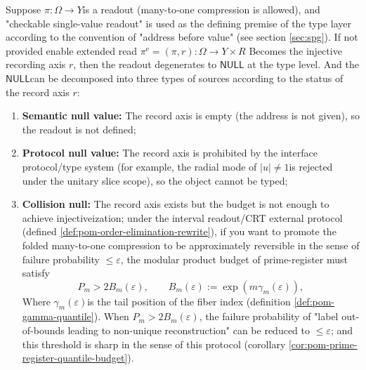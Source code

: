 \begin{proposition}\label{prop:xi-null-three-way}
Suppose \(\pi:\Omega\to Y\) ​​is a readout (many-to-one compression is allowed), and "checkable single-value readout" is used as the defining premise of the type layer according to the convention of "address before value" (see section \ref{sec:spg}).
If not provided enable extended read
\(
\pi^{\mathrm e}=(\pi,r):\Omega\to Y\times R
\)
Becomes the injective recording axis \(r\), then the readout degenerates to \(\mathsf{NULL}\) at the type level.
And the \(\mathsf{NULL}\) ​​can be decomposed into three types of sources according to the status of the record axis \(r\):
\begin{enumerate}
  \item ​​\textbf{Semantic null value:} The record axis is empty (the address is not given), so the readout is not defined;
  \item \textbf{Protocol null value:} The record axis is prohibited by the interface protocol/type system (for example, the radial mode of \(|u|\neq 1\) ​​is rejected under the unitary slice scope), so the object cannot be typed;
  \item \textbf{Collision null:} The record axis exists but the budget is not enough to achieve injectiveization; under the interval readout/CRT external protocol (defined \ref{def:pom-order-elimination-rewrite}), if you want to promote the folded many-to-one compression to be approximately reversible in the sense of failure probability \(\le\varepsilon\), the modular product budget of prime-register must satisfy
  \[
  P_m>2B_m(\varepsilon),
  \qquad
  B_m(\varepsilon):=\exp(m\gamma_m(\varepsilon)),
  \]
  Where \(\gamma_m(\varepsilon)\) ​​is the tail position of the fiber index (definition \ref{def:pom-gamma-quantile}).
  When \(P_m>2B_m(\varepsilon)\), the failure probability of "label out-of-bounds leading to non-unique reconstruction" can be reduced to \(\le\varepsilon\); and this threshold is sharp in the sense of this protocol (corollary \ref{cor:pom-prime-register-quantile-budget}).
\end{enumerate}
\end{proposition}

